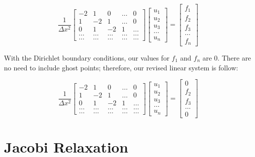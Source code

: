 \documentclass{article}
\begin{document}
\[
\dfrac{1}{\Delta x^2}\begin{bmatrix}
-2 & 1 & 0 & \dots & 0 \\
1 & -2 & 1 & \dots & 0 \\
0 & 1 & -2 & 1 & \dots \\
\dots  & \dots  & \dots  & \dots & \dots  \\
\dots & \dots & \dots & \dots & \dots 
\end{bmatrix}
\begin{bmatrix}
u_1 \\ u_2 \\ u_3 \\ \dots \\ u_n 
\end{bmatrix}
=
\begin{bmatrix}
f_1 \\ f_2 \\ f_3 \\ \dots \\ f_n 
\end{bmatrix}
\]

\noindent
With the Dirichlet boundary conditions, our values for $f_1$ and $f_n$ are 0. There are no need to include ghost points; therefore, our revised linear system is follow: 

\[
\dfrac{1}{\Delta x^2}\begin{bmatrix}
-2 & 1 & 0 & \dots & 0 \\
1 & -2 & 1 & \dots & 0 \\
0 & 1 & -2 & 1 & \dots \\
\dots  & \dots  & \dots  & \dots & \dots  \\
\dots & \dots & \dots & \dots & \dots 
\end{bmatrix}
\begin{bmatrix}
u_1 \\ u_2 \\ u_3 \\ \dots \\ u_n 
\end{bmatrix}
=
\begin{bmatrix}
0 \\ f_2 \\ f_3 \\ \dots \\ 0 
\end{bmatrix}
\]

\section{Jacobi Relaxation}
\end{document}
